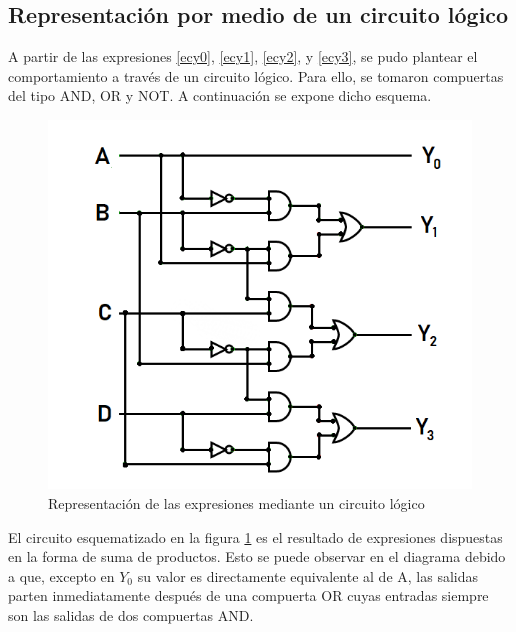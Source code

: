 \subsection{Representaci\'on por medio de un circuito l\'ogico}

\noindent
A partir de las expresiones \ref{ecy0},  \ref{ecy1}, \ref{ecy2}, y \ref{ecy3}, se pudo plantear el comportamiento a trav\'es de un circuito l\'ogico. Para ello, se tomaron compuertas del tipo AND, OR y NOT. A continuaci\'on se expone dicho esquema.

\begin{figure}[h!]
    \centering
    \includegraphics[scale=0.6]{images/ej4/logiccircuitej4.png}
    \caption{Representaci\'on de las expresiones mediante un circuito l\'ogico}
    \label{fig:circuito4fig}
\end{figure}

\noindent
El circuito esquematizado en la figura \ref{fig:circuito4fig} es el resultado de expresiones dispuestas en la forma de suma de productos. Esto se puede observar en el diagrama debido a que, excepto en $Y_0$ su valor es directamente equivalente al de A, las salidas parten inmediatamente despu\'es de una compuerta OR cuyas entradas siempre son las salidas de dos compuertas AND. 